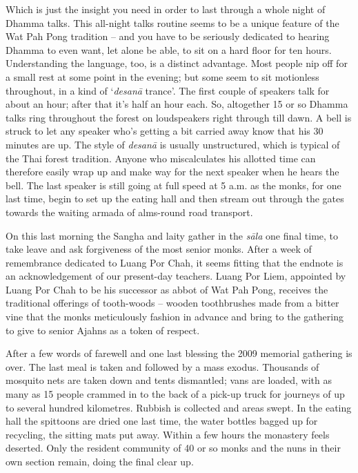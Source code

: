 Which is just the insight you need in order to last through a whole
night of Dhamma talks. This all-night talks routine seems to be a unique
feature of the Wat Pah Pong tradition -- and you have to be seriously
dedicated to hearing Dhamma to even want, let alone be able, to sit on a
hard floor for ten hours. Understanding the language, too, is a distinct
advantage. Most people nip off for a small rest at some point in the
evening; but some seem to sit motionless throughout, in a kind of
`\emph{desanā} trance'. The first couple of speakers talk for about an
hour; after that it's half an hour each. So, altogether 15 or so
Dhamma talks ring throughout the forest on loudspeakers right through
till dawn. A bell is struck to let any speaker who's getting a bit
carried away know that his 30 minutes are up. The style of \emph{desanā}
is usually unstructured, which is typical of the Thai forest tradition. 
Anyone who miscalculates his allotted time can therefore easily wrap up
and make way for the next speaker when he hears the bell. The last
speaker is still going at full speed at 5 a.m. as the monks, for one
last time, begin to set up the eating hall and then stream out through the gates
towards the waiting armada of alms-round road transport. 

On this last morning the Sangha and laity gather in the \emph{sāla} one
final time, to take leave and ask forgiveness of the most senior monks. 
After a week of remembrance dedicated to Luang Por Chah, it seems
fitting that the endnote is an acknowledgement of our present-day
teachers. Luang Por Liem, appointed by Luang Por Chah to be his
successor as abbot of Wat Pah Pong, receives the traditional offerings
of tooth-woods -- wooden toothbrushes made from a bitter vine that the
monks meticulously fashion in advance and bring to the gathering to give
to senior Ajahns as a token of respect. 

After a few words of farewell and one last blessing the 2009 memorial
gathering is over. The last meal is taken and followed by a mass exodus. 
Thousands of mosquito nets are taken down and tents dismantled; vans are
loaded, with as many as 15 people crammed in to the back of a
pick-up truck for journeys of up to several hundred kilometres. Rubbish
is collected and areas swept. In the eating hall the spittoons are dried
one last time, the water bottles bagged up for recycling, the sitting
mats put away. Within a few hours the monastery feels deserted. Only the
resident community of 40 or so monks and the nuns in their own
section remain, doing the final clear up. 

